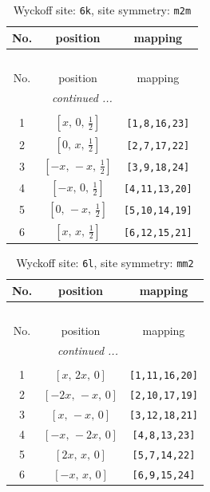 \documentclass[fleqn,8pt]{jsarticle}
\begin{document}
\renewcommand{\arraystretch}{1.2}
\begin{longtable}{ccc}
\caption{Wyckoff site: {\tt 6k}, site symmetry: {\tt m2m}}
 \\
 \hline \hline
No. & position & mapping \\ \hline \endfirsthead

\multicolumn{2}{l}{\tablename\ \thetable{}} \\
 \hline \hline
No. & position & mapping \\ \hline \endhead

 \hline \hline
\multicolumn{2}{r}{\footnotesize\it continued ...} \\ \endfoot

 \hline \hline
\multicolumn{2}{r}{} \\ \endlastfoot

1 & $\left[ x,\, 0,\, \frac{1}{2} \right]$ & {\tt [1,8,16,23]} \\ \hline
2 & $\left[ 0,\, x,\, \frac{1}{2} \right]$ & {\tt [2,7,17,22]} \\ \hline
3 & $\left[ - x,\, - x,\, \frac{1}{2} \right]$ & {\tt [3,9,18,24]} \\ \hline
4 & $\left[ - x,\, 0,\, \frac{1}{2} \right]$ & {\tt [4,11,13,20]} \\ \hline
5 & $\left[ 0,\, - x,\, \frac{1}{2} \right]$ & {\tt [5,10,14,19]} \\ \hline
6 & $\left[ x,\, x,\, \frac{1}{2} \right]$ & {\tt [6,12,15,21]} \\
\end{longtable}
\renewcommand{\arraystretch}{1.2}
\begin{longtable}{ccc}
\caption{Wyckoff site: {\tt 6l}, site symmetry: {\tt mm2}}
 \\
 \hline \hline
No. & position & mapping \\ \hline \endfirsthead

\multicolumn{2}{l}{\tablename\ \thetable{}} \\
 \hline \hline
No. & position & mapping \\ \hline \endhead

 \hline \hline
\multicolumn{2}{r}{\footnotesize\it continued ...} \\ \endfoot

 \hline \hline
\multicolumn{2}{r}{} \\ \endlastfoot

1 & $\left[ x,\, 2 x,\, 0 \right]$ & {\tt [1,11,16,20]} \\ \hline
2 & $\left[ - 2 x,\, - x,\, 0 \right]$ & {\tt [2,10,17,19]} \\ \hline
3 & $\left[ x,\, - x,\, 0 \right]$ & {\tt [3,12,18,21]} \\ \hline
4 & $\left[ - x,\, - 2 x,\, 0 \right]$ & {\tt [4,8,13,23]} \\ \hline
5 & $\left[ 2 x,\, x,\, 0 \right]$ & {\tt [5,7,14,22]} \\ \hline
6 & $\left[ - x,\, x,\, 0 \right]$ & {\tt [6,9,15,24]} \\
\end{longtable}
\end{document}
